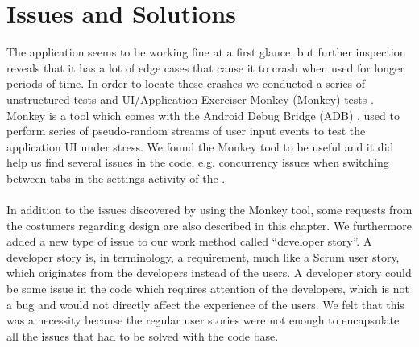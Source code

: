 
\chapter{Issues and Solutions}
\label{sec:sprintone_issues_solutions}
The \launcher application seems to be working fine at a first glance, but further inspection reveals that it has a lot of edge cases that cause it to crash when used for longer periods of time. In order to locate these crashes we conducted a series of unstructured tests and UI/Application Exerciser Monkey (Monkey) tests \parencite{android_monkey}. Monkey is a tool which comes with the Android Debug Bridge (ADB) \parencite{android_adb}, used to perform series of pseudo-random streams of user input events to test the application UI under stress. We found the Monkey tool to be useful and it did help us find several issues in the code, e.g. concurrency issues when switching between tabs in the settings activity of the \launcher.
\\\\
In addition to the issues discovered by using the Monkey tool, some requests from the costumers regarding design are also described in this chapter.  We furthermore added a new type of issue to our work method called ``developer story''. A developer story is, in \giraf terminology, a requirement, much like a Scrum user story, which originates from the developers instead of the users. A developer story could be some issue in the code which requires attention of the developers, which is not a bug and would not directly affect the experience of the users. We felt that this was a necessity because the regular user stories were not enough to encapsulate all the issues that had to be solved with the code base. 






















